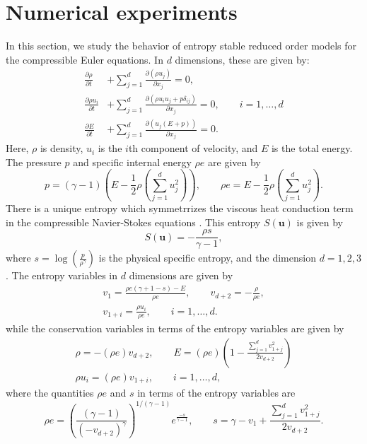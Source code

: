 \documentclass[review]{siamart171218}
\theoremstyle{assumption}
\newcommand{\pd}[2]{\frac{\partial#1}{\partial#2}}
\newcommand{\LRp}[1]{\left( #1 \right)}
\begin{document}
\section{Numerical experiments}
\label{sec:8}
{In this section, we study the behavior of entropy stable reduced order models for} the compressible Euler equations.  In $d$ dimensions, these are given by:
\begin{align*}
\pd{\rho}{t} &+ {\sum_{j=1}^d \pd{\LRp{\rho {u}_j}}{x_j}} = 0,\\
{\pd{\rho {u}_i}{t}} &+ {\sum_{j=1}^d \pd{\LRp{\rho u_iu_j + p\delta_{ij} }}{x_j}} = 0, \qquad i = 1,\ldots,d\\
\pd{E}{t} &+ {\sum_{j=1}^d \pd{\LRp{{u}_j(E+p)}}{x_j}} = 0.\nonumber
\end{align*}
Here, $\rho$ is density, {$u_i$ is the $i$th component of} velocity, and $E$ is the total energy.  The pressure $p$ and specific internal energy $\rho e$ are given by 
\[
{p = (\gamma-1)\LRp{E - \frac{1}{2}\rho \LRp{\sum_{j=1}^d u_j^2}}}, \qquad {\rho e = E - \frac{1}{2}\rho \LRp{\sum_{j=1}^d u_j^2}}. 
\]
There is a unique entropy which symmetrrizes the viscous heat conduction term in the compressible Navier-Stokes equations \cite{hughes1986new}.  This entropy $S(\bm{u})$ is given by
\begin{equation*}
S(\bm{u}) = -\frac{\rho s}{\gamma-1}, 
\end{equation*}
where $s = \log\LRp{\frac{p}{\rho^\gamma}}$ is the physical specific entropy, and the dimension $d = 1,2,3$.  The entropy variables in $d$ dimensions are given by
\begin{gather*}
v_1 = \frac{\rho e (\gamma + 1 - s) - E}{\rho e}, \qquad v_{d+2} = -\frac{\rho}{\rho e},\\
v_{1+ i}= \frac{\rho {{u}_i}}{\rho e}, \qquad i = 1,\ldots, d.
\end{gather*}
while the conservation variables in terms of the entropy variables are given by
\begin{gather*}
\rho = -(\rho e) v_{d+2}, \qquad E = (\rho e)\LRp{1 - \frac{\sum_{j=1}^d{v_{1+j}^2}}{2 v_{d+2}}}\\
 \rho {u_i} = (\rho e) v_{1+i}, \qquad i = 1,\ldots,d,
\end{gather*}
where the quantities $\rho e$ and $s$ in terms of the entropy variables are 
\begin{equation*}
\rho e = \LRp{\frac{(\gamma-1)}{\LRp{-v_{d+2}}^{\gamma}}}^{1/(\gamma-1)}e^{\frac{-s}{\gamma-1}}, \qquad s = \gamma - v_1 + \frac{\sum_{j=1}^d{v_{1+j}^2}}{2v_{d+2}}.
\end{equation*}
\end{document}
